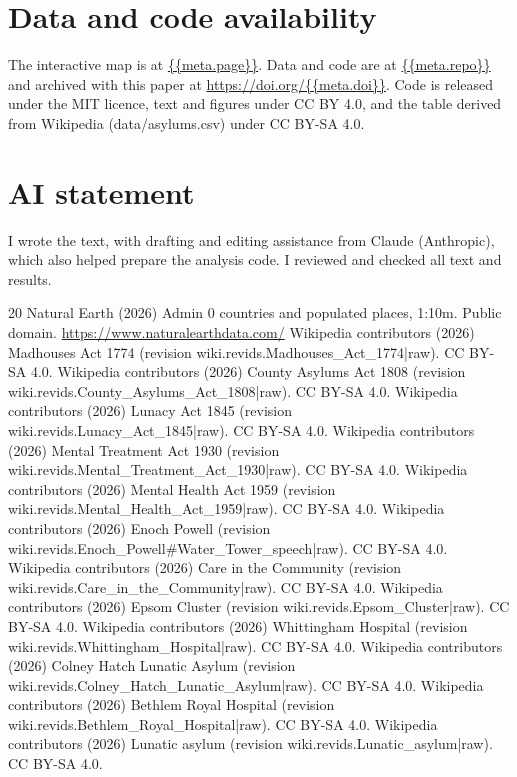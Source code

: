 \documentclass[11pt,a4paper]{article}
\begin{document}
\section*{Data and code availability}
The interactive map is at \url{{{meta.page}}}. Data and code are at \url{{{meta.repo}}} and archived with this paper at \url{https://doi.org/{{meta.doi}}}. Code is released under the MIT licence, text and figures under CC BY 4.0, and the table derived from Wikipedia (data/asylums.csv) under CC BY-SA 4.0.

\section*{AI statement}
I wrote the text, with drafting and editing assistance from Claude (Anthropic), which also helped prepare the analysis code. I reviewed and checked all text and results.

\begin{thebibliography}{20}
 Natural Earth (2026) Admin 0 countries and populated places, 1:10m. Public domain. \url{https://www.naturalearthdata.com/}
 Wikipedia contributors (2026) Madhouses Act 1774 (revision {{wiki.revids.Madhouses_Act_1774|raw}}). CC BY-SA 4.0.
 Wikipedia contributors (2026) County Asylums Act 1808 (revision {{wiki.revids.County_Asylums_Act_1808|raw}}). CC BY-SA 4.0.
 Wikipedia contributors (2026) Lunacy Act 1845 (revision {{wiki.revids.Lunacy_Act_1845|raw}}). CC BY-SA 4.0.
 Wikipedia contributors (2026) Mental Treatment Act 1930 (revision {{wiki.revids.Mental_Treatment_Act_1930|raw}}). CC BY-SA 4.0.
 Wikipedia contributors (2026) Mental Health Act 1959 (revision {{wiki.revids.Mental_Health_Act_1959|raw}}). CC BY-SA 4.0.
 Wikipedia contributors (2026) Enoch Powell (revision {{wiki.revids.Enoch_Powell#Water_Tower_speech|raw}}). CC BY-SA 4.0.
 Wikipedia contributors (2026) Care in the Community (revision {{wiki.revids.Care_in_the_Community|raw}}). CC BY-SA 4.0.
 Wikipedia contributors (2026) Epsom Cluster (revision {{wiki.revids.Epsom_Cluster|raw}}). CC BY-SA 4.0.
 Wikipedia contributors (2026) Whittingham Hospital (revision {{wiki.revids.Whittingham_Hospital|raw}}). CC BY-SA 4.0.
 Wikipedia contributors (2026) Colney Hatch Lunatic Asylum (revision {{wiki.revids.Colney_Hatch_Lunatic_Asylum|raw}}). CC BY-SA 4.0.
 Wikipedia contributors (2026) Bethlem Royal Hospital (revision {{wiki.revids.Bethlem_Royal_Hospital|raw}}). CC BY-SA 4.0.
 Wikipedia contributors (2026) Lunatic asylum (revision {{wiki.revids.Lunatic_asylum|raw}}). CC BY-SA 4.0.
\end{thebibliography}
\end{document}
